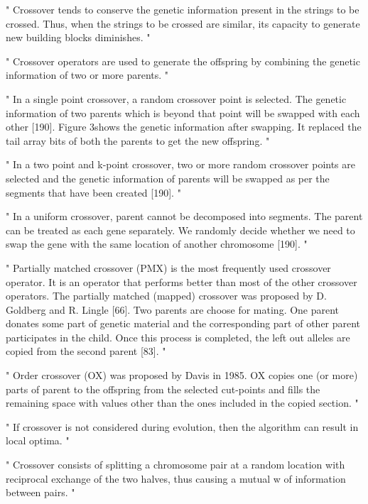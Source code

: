 "
Crossover tends to conserve the genetic information present in the strings to be crossed. Thus, when the strings to be crossed are similar, its capacity to generate new building blocks diminishes.
"\cite{srinivas_genetic_1994}

"
Crossover operators are used to generate the offspring by combining the genetic information of two or more parents.
"\cite{katoch_review_2021}

"
In a single point crossover, a random crossover point is selected. The genetic information of two parents which is beyond that point will be swapped with each other [190]. Figure 3shows the genetic information after swapping. It replaced the tail array bits of both the parents to get the new offspring.
"\cite{katoch_review_2021}

"
In a two point and k-point crossover, two or more random crossover points are selected and the genetic information of parents will be swapped as per the segments that have been created [190].
"\cite{katoch_review_2021}

"
In a uniform crossover, parent cannot be decomposed into segments. The parent can be treated as each gene separately. We randomly decide whether we need to swap the gene with the same location of another chromosome [190].
"\cite{katoch_review_2021}


"
Partially matched crossover (PMX) is the most frequently used crossover operator. It is an operator that performs better than most of the other crossover operators. The partially matched (mapped) crossover was proposed by D. Goldberg and R. Lingle [66]. Two parents are choose for mating. One parent donates some part of genetic material and the corresponding part of other parent participates in the child. Once this process is completed, the left out alleles are copied from the second parent [83].
"\cite{katoch_review_2021}


"
Order crossover (OX) was proposed by Davis in 1985. OX copies one (or more) parts of parent to the offspring from the selected cut-points and fills the remaining space with values other than the ones included in the copied section.
"\cite{katoch_review_2021}

"
If crossover is not considered during evolution, then the algorithm can result in local optima.
"\cite{katoch_review_2021}

"
Crossover consists of splitting a chromosome pair at a random location with reciprocal exchange of the two halves, thus causing a mutual w of information between pairs.
"\cite{marsili_libelli_adaptive_2000}

